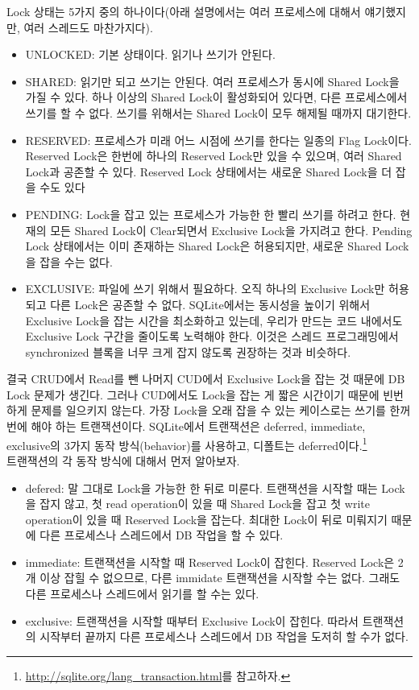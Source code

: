 Lock 상태는 5가지 중의 하나이다(아래 설명에서는 여러 프로세스에 대해서 얘기했지만, 여러 스레드도 마찬가지다).
\begin{itemize}
\item UNLOCKED: 기본 상태이다. 읽기나 쓰기가 안된다.
\item SHARED: 읽기만 되고 쓰기는 안된다. 여러 프로세스가 동시에 Shared Lock을 가질 수 있다. 하나 이상의 Shared Lock이 활성화되어 있다면, 다른 프로세스에서 쓰기를 할 수 없다. 쓰기를 위해서는 Shared Lock이 모두 해제될 때까지 대기한다.
\item RESERVED: 프로세스가 미래 어느 시점에 쓰기를 한다는 일종의 Flag Lock이다. Reserved Lock은 한번에 하나의 Reserved Lock만 있을 수 있으며, 여러 Shared Lock과 공존할 수 있다. Reserved Lock 상태에서는 새로운 Shared Lock을 더 잡을 수도 있다 
\item PENDING: Lock을 잡고 있는 프로세스가 가능한 한 빨리 쓰기를 하려고 한다. 현재의 모든 Shared Lock이 Clear되면서 Exclusive Lock을 가지려고 한다. Pending Lock 상태에서는 이미 존재하는 Shared Lock은 허용되지만, 새로운 Shared Lock을 잡을 수는 없다. 
\item EXCLUSIVE: 파일에 쓰기 위해서 필요하다. 오직 하나의 Exclusive Lock만 허용되고 다른 Lock은 공존할 수 없다. SQLite에서는 동시성을 높이기 위해서 Exclusive Lock을 잡는 시간을 최소화하고 있는데, 우리가 만드는 코드 내에서도 Exclusive Lock 구간을 줄이도록 노력해야 한다. 이것은 스레드 프로그래밍에서 synchronized 블록을 너무 크게 잡지 않도록 권장하는 것과 비슷하다. \\
\end{itemize}

결국 CRUD에서 Read를 뺀 나머지 CUD에서 Exclusive Lock을 잡는 것 때문에 DB Lock 문제가 생긴다. 그러나 CUD에서도 Lock을 잡는 게 짧은 시간이기 때문에 빈번하게 문제를 일으키지 않는다. 가장 Lock을 오래 잡을 수 있는 케이스로는 쓰기를 한꺼번에 해야 하는 트랜잭션이다.
SQLite에서 트랜잭션은 deferred, immediate, exclusive의 3가지 동작 방식(behavior)를 사용하고, 디폴트는 deferred이다.\footnote{\url{http://sqlite.org/lang\_transaction.html}를 참고하자.}\\

트랜잭션의 각 동작 방식에 대해서 먼저 알아보자.
\begin{itemize}
\item defered: 말 그대로 Lock을 가능한 한 뒤로 미룬다. 트랜잭션을 시작할 때는 Lock을 잡지 않고, 첫 read operation이 있을 때 Shared Lock을 잡고 첫 write operation이 있을 때 Reserved Lock을 잡는다. 최대한 Lock이 뒤로 미뤄지기 때문에 다른 프로세스나 스레드에서 DB 작업을 할 수 있다. 
\item immediate: 트랜잭션을 시작할 때 Reserved Lock이 잡힌다. Reserved Lock은 2개 이상 잡힐 수 없으므로, 다른 immidate 트랜잭션을 시작할 수는 없다. 그래도 다른 프로세스나 스레드에서 읽기를 할 수는 있다.
\item exclusive: 트랜잭션을 시작할 때부터 Exclusive Lock이 잡힌다. 따라서 트랜잭션의 시작부터 끝까지 다른 프로세스나 스레드에서 DB 작업을 도저히 할 수가 없다.
\end{itemize}

